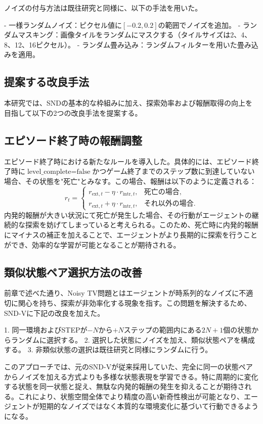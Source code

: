 ノイズの付与方法は既往研究と同様に、以下の手法を用いた。

- 一様ランダムノイズ：ピクセル値に\([-0.2, 0.2]\)の範囲でノイズを追加。
- ランダムマスキング：画像タイルをランダムにマスクする（タイルサイズは2、4、8、12、16ピクセル）。
- ランダム畳み込み：ランダムフィルターを用いた畳み込みを適用。

\subsection{提案する改良手法}
本研究では、SNDの基本的な枠組みに加え、探索効率および報酬取得の向上を目指して以下の2つの改良手法を提案する。

\subsection{エピソード終了時の報酬調整}

エピソード終了時における新たなルールを導入した。具体的には、エピソード終了時に\(\text{level\_complete} = \text{false}\)かつゲーム終了までのステップ数に到達していない場合、その状態を"死亡"とみなす。この場合、報酬は以下のように定義される：
\[
 r_t = \begin{cases}
 r_{\text{ext}, t} - \eta \cdot r_{\text{intr}, t}, & \text{死亡の場合},\\
 r_{\text{ext}, t} + \eta \cdot r_{\text{intr}, t}, & \text{それ以外の場合}.
\end{cases}
\]
内発的報酬が大きい状況にて死亡が発生した場合、その行動がエージェントの継続的な探索を妨げてしまっていると考えられる。このため、死亡時に内発的報酬にマイナスの補正を加えることで、エージェントがより長期的に探索を行うことができ、効率的な学習が可能となることが期待される。


\subsection{類似状態ペア選択方法の改善}
前章で述べた通り、Noisy TV問題とはエージェントが時系列的なノイズに不適切に関心を持ち、探索が非効率化する現象を指す。この問題を解決するため、SND-Vに下記の改良を加えた。

1. 同一環境およびSTEPが\(-N\)から\(+N\)ステップの範囲内にある\(2N+1\)個の状態からランダムに選択する。
2. 選択した状態にノイズを加え、類似状態ペアを構成する。
3. 非類似状態の選択は既往研究と同様にランダムに行う。

このアプローチでは、元のSND-Vが従来採用していた、完全に同一の状態ペアからノイズを加える方式よりも多様な状態表現を学習できる。特に周期的に変化する状態を同一状態と捉え、無駄な内発的報酬の発生を抑えることが期待される。これにより、状態空間全体でより精度の高い新奇性検出が可能となり、エージェントが短期的なノイズではなく本質的な環境変化に基づいて行動できるようになる。




